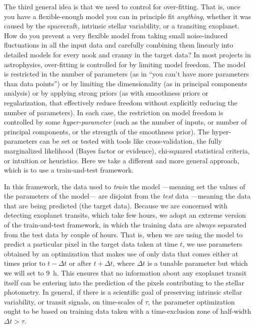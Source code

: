 \documentclass[12pt, preprint]{aastex}
\begin{document}
The third general idea is that we need to control for over-fitting.
That is, once you have a flexible-enough model you can in principle fit \emph{anything},
  whether it was caused by the spacecraft, intrinsic stellar variability, or a transiting exoplanet.
How do you prevent a very flexible model from taking small noise-induced fluctuations in all the input data
  and carefully combining them linearly into detailed models for every nook and cranny in the target data?
In most projects in astrophysics, over-fitting is controlled for by limiting model freedom.
The model is restricted in the number of parameters
  (as in ``you can't have more parameters than data points'')
  or by limiting the dimensionality
  (as in principal components analysis)
  or by applying strong priors
  (as with smoothness priors or regularization, 
  that effectively reduce freedom without explicitly reducing the number of parameters).
In each case, the restriction on model freedom is controlled by some \emph{hyper-parameter}
  (such as the number of inputs, or number of principal components, or the strength of the smoothness prior).
The hyper-parameters can be set or tested with tools like cross-validation,
  the fully marginalized likelihood (Bayes factor or evidence),
  chi-squared statistical criteria,
  or intuition or heuristics.
Here we take a different and more general approach, which is to use a train-and-test framework.

In this framework, the data used to \emph{train} the model%
  ---meaning set the values of the parameters of the model---%
  are disjoint from the \emph{test} data
  ---meaning the data that are being predicted (the target data).
Because we are concerned with detecting exoplanet transits,
  which take few hours,
  we adopt an extreme version of the train-and-test framework,
  in which the training data are always separated from the test data by couple of hours.
That is, when we are using the model to predict a particular pixel in the target data taken at time $t$,
  we use parameters obtained by an optimization that makes use of only data
  that comes either at times prior to $t-\Delta t$ or after $t+\Delta t$,
  where $\Delta t$ is a tunable parameter but which we will set to $9$~h.
This ensures that no information about any exoplanet transit itself
  can be entering into the prediction of the pixels contributing to the stellar photometry.
In general, if there is a scientific goal of preserving intrinsic stellar variability,
  or transit signals,
  on time-scales of $\tau$,
  the parameter optimization ought to be based on training data taken with a time-exclusion zone of half-width $\Delta t > \tau$.
\end{document}
